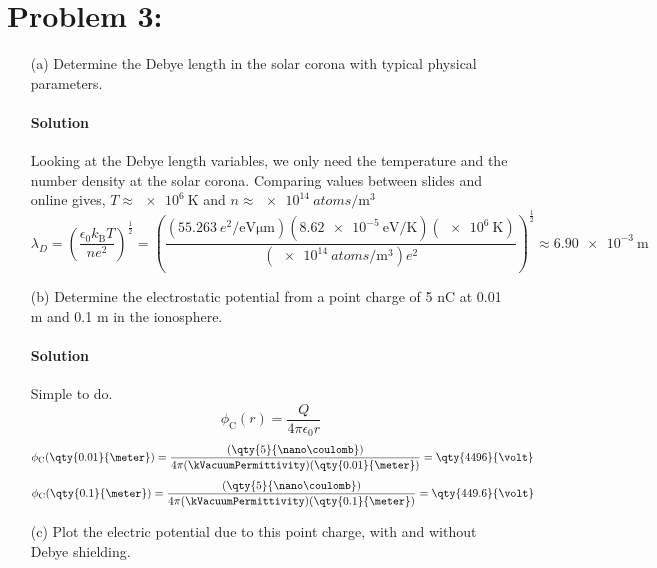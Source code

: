\documentclass{article}
\begin{document}
	\section*{Problem 3: }
	\begin{enumerate}
		\item[(a)] Determine the Debye length in the solar corona with typical physical parameters.
			\paragraph{Solution} Looking at the Debye length variables, we only need the temperature and the number density at the solar corona. Comparing values between slides and online gives, $T \approx \qty{e6}{\kelvin}$ and $n \approx \qty{e14}{atoms\per\meter\cubed}$ \\
			\[
				\lambda_D = \left( \frac{\epsilon_0 k_\mathrm{B}T}{ne^2} \right)^\frac{1}{2} = \left( \frac{(\qty{55.263}{e^2\per\electronvolt\micro\meter})(\qty{8.62e-5}{\electronvolt\per\kelvin})(\qty{e6}{\kelvin})}{(\qty{e14}{atoms\per\meter\cubed})e^2} \right)^\frac{1}{2} \approx \qty{6.90e-3}{\meter}
			\]
		
		
		
		\item[(b)] Determine the electrostatic potential from a point charge of 5 nC at 0.01 m and 0.1 m in the ionosphere.		
			\paragraph{Solution} Simple to do. \\
			\[
				\phi_\mathrm{C}(r) = \frac{Q}{4\pi \epsilon_0 r}
			\]
			\[
				\phi_\mathrm{C}(\qty{0.01}{\meter}) = \frac{(\qty{5}{\nano\coulomb})}{4\pi (\kVacuumPermittivity) (\qty{0.01}{\meter})} = \qty{4496}{\volt}
			\]
			\[
				\phi_\mathrm{C}(\qty{0.1}{\meter}) = \frac{(\qty{5}{\nano\coulomb})}{4\pi (\kVacuumPermittivity) (\qty{0.1}{\meter})} = \qty{449.6}{\volt}
			\]
		
		\item[(c)] Plot the electric potential due to this point charge, with and without Debye shielding.

\end{enumerate}
\end{document}
